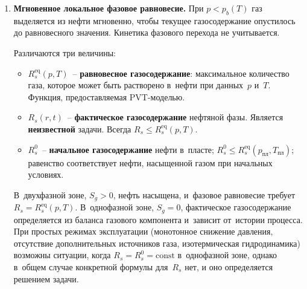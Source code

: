 \documentclass[12pt,a4paper]{article}
\newcommand{\ppl}{p_{\text{пл}}}
\newcommand{\pb}{p_b}
\newcommand{\Tpl}{T_{\text{пл}}}
\begin{document}
\begin{enumerate}[label=\arabic*., nosep]
  \item \textbf{Мгновенное локальное фазовое равновесие.}
        При $p < \pb(T)$ газ выделяется из нефти мгновенно,
        чтобы текущее газосодержание опустилось до равновесного значения.
        Кинетика фазового перехода не учитывается.

        Различаются три величины:
        \begin{itemize}[nosep]
          \item $R_s^{\text{eq}}(p,T)$~-- \textbf{равновесное
                газосодержание}: максимальное количество газа, которое
                может быть растворено в~нефти при данных~$p$ и~$T$.
                Функция, предоставляемая PVT-моделью.
          \item $R_s(r,t)$~-- \textbf{фактическое газосодержание}
                нефтяной фазы. Является \textbf{неизвестной} задачи.
                Всегда $R_s \leqslant R_s^{\text{eq}}(p,T)$.
          \item $R_s^0$~-- \textbf{начальное газосодержание} нефти
                в~пласте; $R_s^0 \leqslant R_s^{\text{eq}}(\ppl, \Tpl)$;
                равенство соответствует нефти, насыщенной газом при
                начальных условиях.
        \end{itemize}

        В~двухфазной зоне, $S_g > 0$, нефть насыщена, и~фазовое
        равновесие требует $R_s = R_s^{\text{eq}}(p,T)$. В~однофазной
        зоне, $S_g = 0$, фактическое газосодержание определяется из
        баланса газового компонента и~зависит от~истории процесса.
        При простых режимах эксплуатации (монотонное снижение давления,
        отсутствие дополнительных источников газа, изотермическая
        гидродинамика) возможны ситуации, когда $R_s = R_s^0 = \mathrm{const}$
        в~однофазной зоне, однако в~общем случае конкретной формулы
        для~$R_s$ нет, и оно определяется решением задачи.


\end{enumerate}
\end{document}

